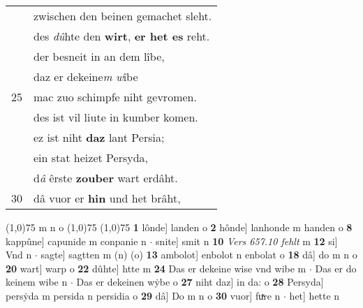 \documentclass[8pt,a4paper,notitlepage]{article}
\begin{document}
\begin{table}[ht]
\begin{minipage}[t]{0.5\linewidth}
\begin{tabular}{rl}
 & zwischen den beinen gemachet sleht.\\ 
 & des \textit{dû}hte den \textbf{wirt}, \textbf{er het es} reht.\\ 
 & der besneit in an dem lîbe,\\ 
 & daz er dekeine\textit{m} \textit{w}îbe\\ 
25 & mac zuo schimpfe niht gevromen.\\ 
 & des ist vil liute in kumber komen.\\ 
 & ez ist niht \textbf{daz} lant Persia;\\ 
 & ein stat heizet Persyda,\\ 
 & d\textit{â} êrste \textbf{zouber} wart erdâht.\\ 
30 & dâ vuor er \textbf{hin} und het brâht,\\ 
\end{tabular}
\scriptsize
\line(1,0){75} \newline
m n o \newline
\line(1,0){75} \newline
\newline
\line(1,0){75} \newline
\textbf{1} lônde] landen o \textbf{2} hônde] lanhonde m handen o \textbf{8} kappûne] capunide m conpanie n  $\cdot$ snite] smit n \textbf{10} \textit{Vers 657.10 fehlt} m  \textbf{12} si] Vnd n  $\cdot$ sagte] sagtten m (n) (o) \textbf{13} ambolot] enbolot n enbolat o \textbf{18} dâ] do m n o \textbf{20} wart] warp o \textbf{22} dûhte] htte m \textbf{24} Das er dekeine wise vnd wibe m  $\cdot$ Das er do keinem wibe n  $\cdot$ Das er dekeinen wẏbe o \textbf{27} niht daz] in da: o \textbf{28} Persyda] persẏda m persida n persidia o \textbf{29} dâ] Do m n o \textbf{30} vuor] fuͯre n  $\cdot$ het] hette n \newline
\end{minipage}
\end{table}
\newpage
\end{document}
